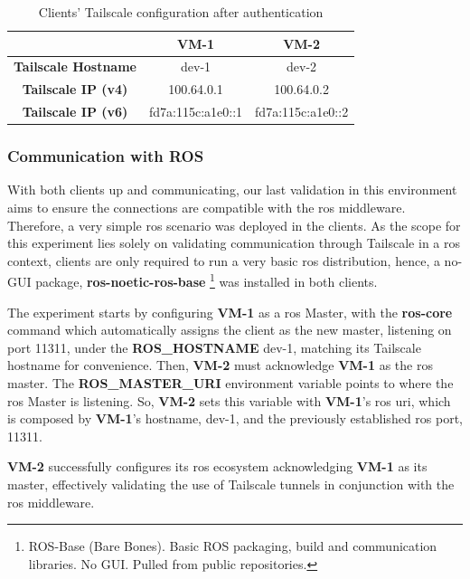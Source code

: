 \documentclass[11pt,twoside,a4paper]{report}
\begin{document}
\begin{table}[]
\centering
\begin{tabular}{c|c|c|}
\cline{2-3}
\textbf{}                                         & \textbf{VM-1} & \textbf{VM-2} \\ \hline
\multicolumn{1}{|c|}{\textbf{Tailscale Hostname}} & dev-1         & dev-2         \\ \hline
\multicolumn{1}{|c|}{\textbf{Tailscale IP (v4)}}  & 100.64.0.1    & 100.64.0.2    \\ \hline
\multicolumn{1}{|c|}{\textbf{Tailscale IP (v6)}}  & fd7a:115c:a1e0::1     & fd7a:115c:a1e0::2         \\ \hline
\end{tabular}
\caption{Clients' Tailscale configuration after authentication}
\label{tab:tsips}
\end{table}

\subsubsection{Communication with ROS}

With both clients up and communicating, our last validation in this environment aims to ensure the connections are compatible with the \ac{ros} middleware. Therefore, a very simple \ac{ros} scenario was deployed in the clients. As the scope for this experiment lies solely on validating communication through Tailscale in a \ac{ros} context, clients are only required to run a very basic \ac{ros} distribution, hence, a no-GUI package, \textbf{ros-noetic-ros-base} \footnote{ROS-Base (Bare Bones). Basic ROS packaging, build and communication libraries. No GUI. Pulled from public repositories.} was installed in both clients.

The experiment starts by configuring \textbf{VM-1} as a \ac{ros} Master, with the \textbf{ros-core} command which automatically assigns the client as the new master, listening on port 11311, under the \textbf{ROS\_HOSTNAME} dev-1, matching its Tailscale hostname for convenience. Then, \textbf{VM-2} must acknowledge \textbf{VM-1} as the \ac{ros} master. The \textbf{ROS\_MASTER\_URI} environment variable points to where the \ac{ros} Master is listening. So, \textbf{VM-2} sets this variable with \textbf{VM-1}'s \ac{ros} \ac{uri}, which is composed by \textbf{VM-1}'s hostname, dev-1, and the previously established \ac{ros} port, 11311.

\textbf{VM-2} successfully configures its \ac{ros} ecosystem acknowledging \textbf{VM-1} as its master, effectively validating the use of Tailscale tunnels in conjunction with the \ac{ros} middleware.
\end{document}
